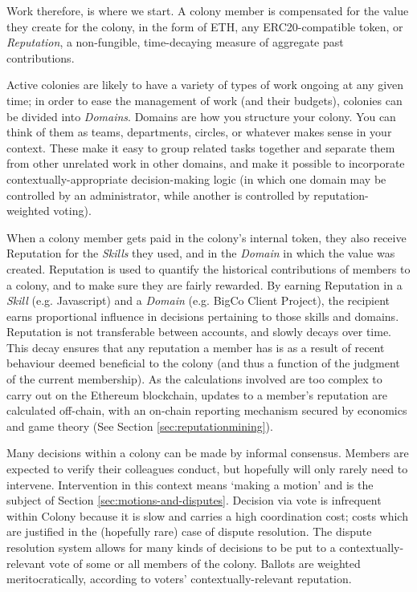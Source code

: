 Work therefore, is where we start. A colony member is compensated for the value they create for the colony, in the form of ETH, any ERC20-compatible token, or \textit{Reputation}, a non-fungible, time-decaying measure of aggregate past contributions.

Active colonies are likely to have a variety of types of work ongoing at any given time; in order to ease the management of work (and their budgets), colonies can be divided into \textit{Domains}. Domains are how you structure your colony. You can think of them as teams, departments, circles, or whatever makes sense in your context. These make it easy to group related tasks together and separate them from other unrelated work in other domains, and make it possible to incorporate contextually-appropriate decision-making logic (in which one domain may be controlled by an administrator, while another is controlled by reputation-weighted voting).

When a colony member gets paid in the colony’s internal token, they also receive Reputation for the \textit{Skills} they used, and in the \textit{Domain} in which the value was created. Reputation is used to quantify the historical contributions of members to a colony, and to make sure they are fairly rewarded. By earning Reputation in a \textit{Skill} (e.g. Javascript) and a \textit{Domain} (e.g. BigCo Client Project), the recipient earns proportional influence in decisions pertaining to those skills and domains. Reputation is not transferable between accounts, and slowly decays over time. This decay ensures that any reputation a member has is as a result of recent behaviour deemed beneficial to the colony (and thus a function of the judgment of the current membership). As the calculations involved are too complex to carry out on the Ethereum blockchain, updates to a member's reputation are calculated off-chain, with an on-chain reporting mechanism secured by economics and game theory (See Section \ref{sec:reputationmining}).

Many decisions within a colony can be made by informal consensus. Members are expected to verify their colleagues conduct, but hopefully will only rarely need to intervene. Intervention in this context means `making a motion' and is the subject of Section \ref{sec:motions-and-disputes}. Decision via vote is infrequent within Colony because it is slow and carries a high coordination cost; costs which are justified in the (hopefully rare) case of dispute resolution. The dispute resolution system allows for many kinds of decisions to be put to a contextually-relevant vote of some or all members of the colony. Ballots are weighted meritocratically, according to voters’ contextually-relevant reputation.

